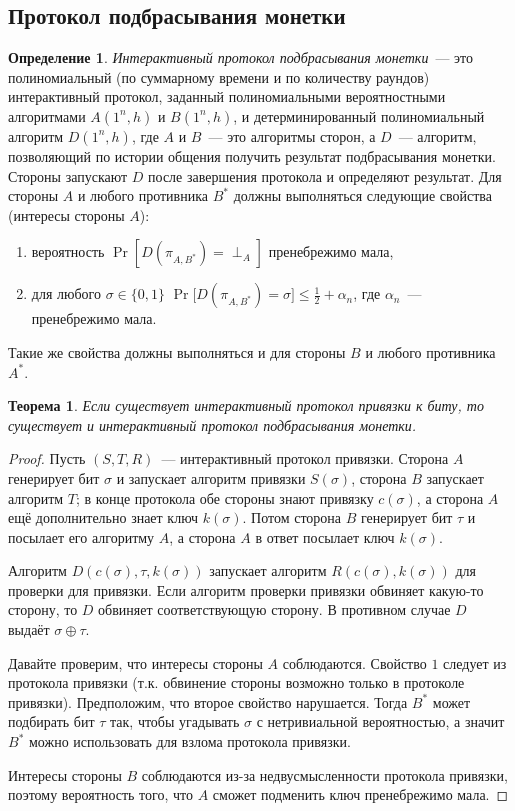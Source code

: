 \documentclass[12pt,a4paper]{article}
\newcommand{\bits}{\{0,1\}}
\theoremstyle{definition}
\newtheorem{definition}{Определение}[section]
\theoremstyle{plain}
\newtheorem{theorem}{Теорема}[section]
\theoremstyle{remark}
\begin{document}
\subsection{Протокол подбрасывания монетки}
\begin{definition}
\emph{Интерактивный протокол подбрасывания монетки}~--- это полиномиальный 
(по суммарному времени и по количеству раундов)
интерактивный протокол, заданный полиномиальными вероятностными алгоритмами 
$A(1^n, h)$ и $B(1^n, h)$, и детерминированный полиномиальный алгоритм $D(1^n, h)$,
где $A$ и $B$~--- это алгоритмы сторон, а $D$~--- алгоритм, 
позволяющий по истории общения получить результат подбрасывания монетки.
Стороны запускают $D$ после завершения протокола и определяют результат.
Для стороны $A$ и любого противника $B^*$ должны выполняться следующие свойства (интересы стороны $A$):
\begin{enumerate}
\item вероятность $\Pr[D(\pi_{A, B^*}) = \perp_A]$ пренебрежимо мала,
\item для любого $\sigma\in\bits$ $\Pr\bigl[D(\pi_{A, B^*}) = \sigma]\le\frac12 + \alpha_n$, где $\alpha_n$~--- пренебрежимо мала.
\end{enumerate}
Такие же свойства должны выполняться и для стороны $B$ и любого противника $A^*$.
\end{definition}
\begin{theorem}
Если существует интерактивный протокол привязки к биту, 
то существует и интерактивный протокол подбрасывания монетки.
\end{theorem}
\begin{proof}
Пусть $(S,T,R)$~--- интерактивный протокол привязки.
Сторона $A$ генерирует бит $\sigma$ и запускает алгоритм привязки $S(\sigma)$,
сторона $B$ запускает алгоритм $T$; в конце протокола обе стороны знают привязку $c(\sigma)$,
а сторона $A$ ещё дополнительно знает ключ $k(\sigma)$. 
Потом сторона $B$ генерирует бит $\tau$ и посылает его алгоритму $A$, а сторона $A$ в ответ посылает
ключ $k(\sigma)$.

Алгоритм $D(c(\sigma), \tau, k(\sigma))$ запускает алгоритм $R(c(\sigma), k(\sigma))$ 
для проверки для привязки.
Если алгоритм проверки привязки обвиняет какую-то сторону, то $D$ обвиняет соответствующую сторону.
В противном случае $D$ выдаёт $\sigma\oplus\tau$.

Давайте проверим, что интересы стороны $A$ соблюдаются. Свойство $1$ следует из протокола привязки
(т.к. обвинение стороны возможно только в протоколе привязки). 
Предположим, что второе свойство нарушается. Тогда $B^*$ может подбирать бит $\tau$ так,
чтобы угадывать $\sigma$ с нетривиальной вероятностью, а значит $B^*$ можно использовать 
для взлома протокола привязки.

Интересы стороны $B$ соблюдаются из-за недвусмысленности протокола привязки,
поэтому вероятность того, что $A$ сможет подменить ключ пренебрежимо мала.
\end{proof}
\end{document}
